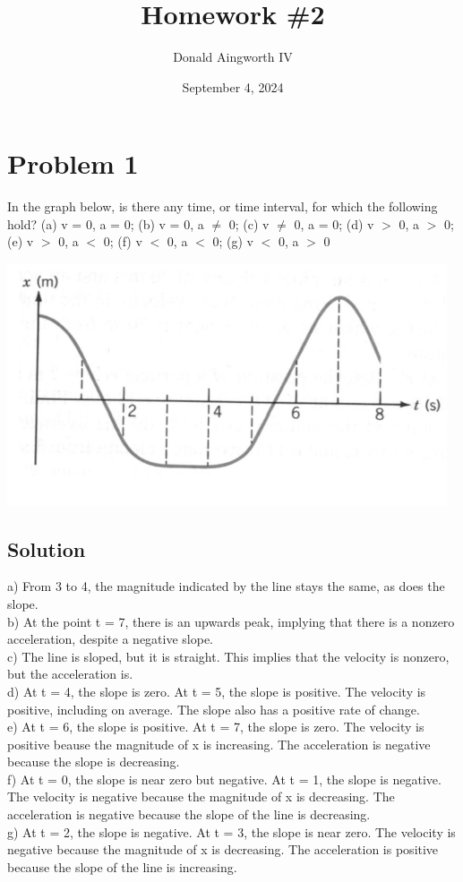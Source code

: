 \documentclass[12pt]{article}
\title{Homework \#2}
\author{Donald Aingworth IV}
\date{September 4, 2024}
\begin{document}

\maketitle

\section*{Problem 1}
In the graph below, is there any time, or time interval, for which the following hold? (a) v = 0, a = 0; (b) v = 0, a $\ne$ 0; (c) v $\ne$ 0, a = 0; (d) v $>$ 0, a $>$ 0; (e) v $>$ 0, a $<$ 0; (f) v $<$ 0, a $<$ 0; (g) v $<$ 0, a $>$ 0

\begin{center}
    \includegraphics*[width=13cm]{graph_1.png}
\end{center}

\subsection*{Solution}
a)  From 3 to 4, the magnitude indicated by the line stays the same, as does the slope. \\
b)  At the point t = 7, there is an upwards peak, implying that there is a nonzero acceleration, despite a negative slope. \\
c)  The line is sloped, but it is straight. This implies that the velocity is nonzero, but the acceleration is. \\
d)  At t = 4, the slope is zero. At t = 5, the slope is positive. The velocity is positive, including on average. The slope also has a positive rate of change. \\
e)  At t = 6, the slope is positive. At t = 7, the slope is zero. The velocity is positive beause the magnitude of x is increasing. The acceleration is negative because the slope is decreasing. \\
f)  At t = 0, the slope is near zero but negative. At t = 1, the slope is negative. The velocity is negative because the magnitude of x is decreasing. The acceleration is negative because the slope of the line is decreasing. \\
g)  At t = 2, the slope is negative. At t = 3, the slope is near zero. The velocity is negative because the magnitude of x is decreasing. The acceleration is positive because the slope of the line is increasing. 
\end{document}
